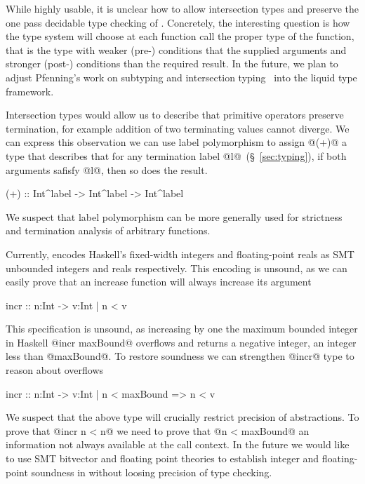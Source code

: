 While highly usable, it is unclear how to allow intersection types 
and preserve the one pass decidable type checking of \toolname.
% 
Concretely, the interesting question is how the type system will choose 
at each function call the proper type of the function, that is the type 
with weaker (pre-) conditions that the supplied arguments 
and stronger (post-) conditions than the required result. 
In the future, we plan to adjust Pfenning's work 
on subtyping and intersection typing~\citep{intersectiontypes,pfenning08,}
into the liquid type framework.


Intersection types would allow us to describe that primitive operators
preserve termination, for example addition of two terminating values cannot diverge. 
%
We can express this observation we can use label polymorphism
to assign @(+)@ a type that describes that for any termination label @l@~(\S~\ref{sec:typing}), 
if both arguments safisfy @l@, then so does the result.
\begin{code}
  (+) :: Int^label -> Int^label -> Int^label 
\end{code}
%
We suspect that label polymorphism can be more generally used for 
strictness and termination analysis of arbitrary functions.


Currently, \toolname encodes 
Haskell's fixed-width integers 
and floating-point reals as SMT unbounded integers and reals respectively.
This encoding is unsound, as we can easily prove that an increase 
function will always increase its argument
\begin{code}
  incr :: n:Int -> {v:Int | n < v}
\end{code}
This specification is unsound, as increasing by one 
the maximum bounded integer in Haskell
@incr maxBound@
overflows and returns a negative integer, 
\ie an integer less than @maxBound@. 
%
To restore soundness we can strengthen @incr@ type to reason about overflows
\begin{code}
  incr :: n:Int -> {v:Int | n < maxBound => n < v}
\end{code}
We suspect that the above type will crucially restrict precision of abstractions. 
To prove that @incr n < n@ we need to prove that @n < maxBound@ 
an information not always available at the call context. 
%
In the future we would like to 
use SMT bitvector and floating point theories to
establish integer and floating-point 
soundness in \toolname without loosing precision of type checking.  

